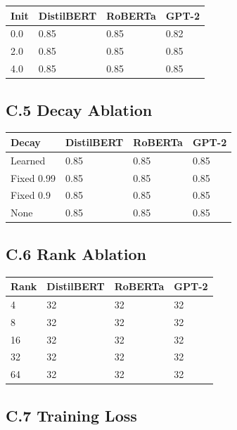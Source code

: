 \begin{table}[H]
\centering
\small
\begin{tabular}{llll}
\toprule
\textbf{Init} & \textbf{DistilBERT} & \textbf{RoBERTa} & \textbf{GPT-2} \\
\midrule
0.0 & 0.85 & 0.85 & 0.82 \\
2.0 & 0.85 & 0.85 & 0.85 \\
4.0 & 0.85 & 0.85 & 0.85 \\
\bottomrule
\end{tabular}
\end{table}

\subsection{C.5 Decay Ablation}

\begin{table}[H]
\centering
\small
\begin{tabular}{llll}
\toprule
\textbf{Decay} & \textbf{DistilBERT} & \textbf{RoBERTa} & \textbf{GPT-2} \\
\midrule
Learned & 0.85 & 0.85 & 0.85 \\
Fixed 0.99 & 0.85 & 0.85 & 0.85 \\
Fixed 0.9 & 0.85 & 0.85 & 0.85 \\
None & 0.85 & 0.85 & 0.85 \\
\bottomrule
\end{tabular}
\end{table}

\subsection{C.6 Rank Ablation}

\begin{table}[H]
\centering
\small
\begin{tabular}{llll}
\toprule
\textbf{Rank} & \textbf{DistilBERT} & \textbf{RoBERTa} & \textbf{GPT-2} \\
\midrule
4 & 32 & 32 & 32 \\
8 & 32 & 32 & 32 \\
16 & 32 & 32 & 32 \\
32 & 32 & 32 & 32 \\
64 & 32 & 32 & 32 \\
\bottomrule
\end{tabular}
\end{table}

\subsection{C.7 Training Loss}

